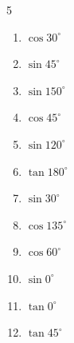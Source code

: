\begin{multicols}{5}
\begin{enumerate}

  \item $\displaystyle \cos{30^\circ}$


  \item $\displaystyle \sin{45^\circ}$


  \item $\displaystyle \sin{150^\circ}$


  \item $\displaystyle \cos{45^\circ}$


  \item $\displaystyle \sin{120^\circ}$


  \item $\displaystyle \tan{180^\circ}$

        \phantom{$\displaystyle =0$}

\columnbreak %

  \item $\displaystyle \sin{30^\circ}$


  \item $\displaystyle \cos{135^\circ}$


  \item $\displaystyle \cos{60^\circ}$


  \item $\displaystyle \sin{0^\circ}$

        \phantom{$\displaystyle =0$}

  \item $\displaystyle \tan{0^\circ}$

        \phantom{$\displaystyle =0$}

  \item $\displaystyle \tan{45^\circ}$

        \phantom{$\displaystyle =1$}


\end{enumerate}
\end{multicols}
